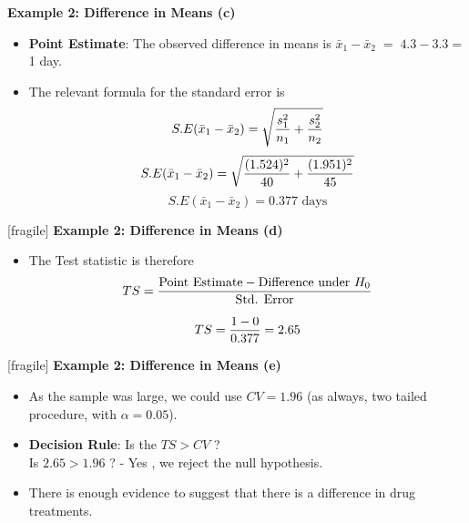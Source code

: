 
\noindent \textbf{Example 2: Difference in Means (c) }
\begin{itemize}
\item \textbf{Point Estimate}: The observed difference in means is $\bar{x}_1-\bar{x}_2 \;= \;4.3-3.3 \;$= 1 day.
\vspace{0.2cm}
\item The relevant formula for the standard error is
\[ S.E(\bar{x}_1 - \bar{x}_2) = \sqrt{{s^2_1\over n_1}+{s^2_2 \over n_2}} \]
 \[ S.E(\bar{x}_1 - \bar{x}_2) = \sqrt{{(1.524)^2 \over 40}+{(1.951)^2 \over 45}}   \]\vspace{0.2cm}
 \[ S.E(\bar{x}_1 - \bar{x}_2) = 0.377\mbox{ days}\]
\end{itemize}


[fragile]
\noindent \textbf{Example 2: Difference in Means (d) }
\vspace{-1cm}
\begin{itemize}
\item The Test statistic is therefore
\[ TS = {\mbox{Point Estimate} - \mbox{Difference under } H_0 \over \mbox{Std. Error}} \]

\[TS = {1 - 0 \over 0.377 } = 2.65 \]


\end{itemize}



[fragile]
\noindent \textbf{Example 2: Difference in Means (e) }
\vspace{-1cm}
\begin{itemize}
\item As the sample was large, we could use $CV = 1.96$ (as always, two tailed procedure, with $\alpha=0.05$).

\item \textbf{Decision Rule}: Is the $TS > CV$ ? \\  Is $2.65 > 1.96$ ? - Yes , we reject the null hypothesis.
\item There is enough evidence to suggest that there is a difference in drug treatments.
\end{itemize}






